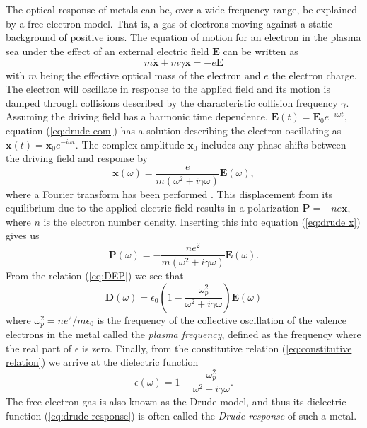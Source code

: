 The optical response of metals can be, over a wide frequency range, be explained by a free electron model. That is, a gas of electrons moving against a static background of positive ions. The equation of motion for an electron in the plasma sea under the effect of an external electric field $\mathbf{E}$ can be written as 
\begin{equation}
    m\mathbf{\ddot{x}} + m\gamma\mathbf{\dot{x}} = -e\mathbf{E}
    \label{eq:drude eom}
\end{equation}
with $m$ being the effective optical mass of the electron and $e$ the electron charge. The electron will oscillate in response to the applied field and its motion is damped through collisions described by the characteristic collision frequency $\gamma$. Assuming the driving field has a harmonic time dependence, $\mathbf{E}(t) = \mathbf{E}_0e^{-i\omega t}$, equation (\ref{eq:drude eom}) has a solution describing the electron oscillating as $\mathbf{x}(t)=\mathbf{x}_0e^{-i\omega t}$. The complex amplitude $\mathbf{x}_0$ includes any phase shifts between the driving field and response by \cite{maier}
\begin{equation}
    \mathbf{x}(\omega) = \frac{e}{m(\omega^2 + i\gamma\omega)} \mathbf{E}(\omega),
    \label{eq:drude x}
\end{equation}
where a Fourier transform has been performed . This displacement from its equilibrium due to the applied electric field results in a polarization $\mathbf{P} = -ne\mathbf{x}$, where $n$ is the electron number density. Inserting this into equation (\ref{eq:drude x}) gives us
\begin{equation}
    \mathbf{P}(\omega) = -\frac{ne^2}{m(\omega^2 + i\gamma\omega)} \mathbf{E}(\omega).
    \label{eq:polarization}
\end{equation}
From the relation (\ref{eq:DEP}) we see that
\begin{equation}
    \mathbf{D}(\omega) = \epsilon_0(1 - \frac{\omega_p^2}{\omega^2 + i\gamma \omega}) \mathbf{E}(\omega)
\end{equation}
where $\omega_p^2 = ne^2/m\epsilon_0$ is the frequency of the collective oscillation of the valence electrons in the metal called the \emph{plasma frequency}, defined as the frequency where the real part of $\epsilon$ is zero\cite{web:dresselhaus}. Finally, from the constitutive relation (\ref{eq:constitutive relation}) we arrive at the dielectric function
\begin{equation}
    \epsilon(\omega) = 1-\frac{\omega_p^2}{\omega^2 + i\gamma \omega}.
    \label{eq:drude response}
\end{equation}
The free electron gas is also known as the Drude model, and thus its dielectric function (\ref{eq:drude response}) is often called the \emph{Drude response} of such a metal.

